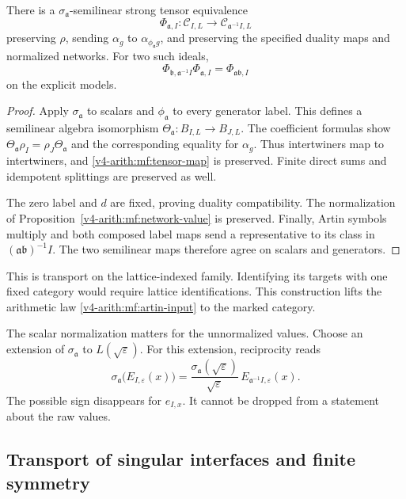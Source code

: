 \begin{theorem}\label{v4-arith:at:thm:artin}
There is a \(\sigma_{\mathfrak a}\)-semilinear strong tensor
equivalence
\[
 \Phi_{\mathfrak a,I}:\mathcal C_{I,L}
       \longrightarrow\mathcal C_{\mathfrak a^{-1}I,L}
\]
preserving \(\rho\), sending \(\alpha_g\) to
\(\alpha_{\phi_{\mathfrak a}g}\), and preserving the specified
duality maps and normalized networks. For two such ideals,
\[
 \Phi_{\mathfrak b,\mathfrak a^{-1}I}\Phi_{\mathfrak a,I}
       =\Phi_{\mathfrak a\mathfrak b,I}
\]
on the explicit models.
\end{theorem}
\begin{proof}
Apply \(\sigma_{\mathfrak a}\) to scalars and \(\phi_{\mathfrak a}\)
to every generator label. This defines a semilinear algebra
isomorphism \(\Theta_{\mathfrak a}:B_{I,L}\to
B_{J,L}\). The coefficient formulas show
\(\Theta_{\mathfrak a}\rho_I=\rho_J\Theta_{\mathfrak a}\) and the
corresponding equality for \(\alpha_g\).
Thus intertwiners map to intertwiners, and
\eqref{v4-arith:mf:tensor-map} is preserved. Finite direct sums
and idempotent splittings are preserved as well.

The zero label and \(d\) are fixed, proving duality compatibility.
The normalization of Proposition~\ref{v4-arith:mf:network-value} is preserved.
Finally, Artin symbols multiply and both composed label maps send
a representative to its class in \((\mathfrak a\mathfrak b)^{-1}I\).
The two semilinear maps therefore agree on scalars and generators.
\end{proof}

This is transport on the lattice-indexed family. Identifying its
targets with one fixed category would require lattice identifications.
This construction lifts the arithmetic law
\eqref{v4-arith:mf:artin-input} to the marked category.


The scalar normalization matters for the unnormalized values.
Choose an extension of \(\sigma_{\mathfrak a}\) to
\(L(\sqrt\varepsilon)\). For this extension, reciprocity reads
\[
 \sigma_{\mathfrak a}\bigl(E_{I,\varepsilon}(x)\bigr)
 =\frac{\sigma_{\mathfrak a}(\sqrt\varepsilon)}
        {\sqrt\varepsilon}\,
   E_{\mathfrak a^{-1}I,\varepsilon}(x).
\]
The possible sign disappears for \(e_{I,x}\).
It cannot be dropped from a statement about the raw values.

\subsection{Transport of singular interfaces and finite symmetry}

